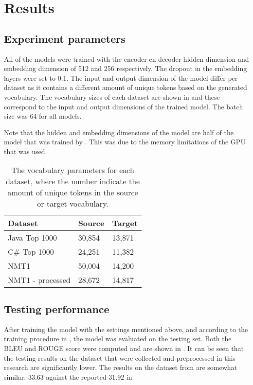 \section{Results}\label{sec:results}

\subsection{Experiment parameters}
All of the models were trained with the encoder en decoder hidden dimension and embedding dimension of 512 and 256 respectively. The dropout in the embedding layers were set to $0.1$. The input and output dimension of the model differ per dataset as it contains a different amount of unique tokens based on the generated vocabulary. The vocabulary sizes of each dataset are shown in  and these correspond to the input and output dimensions of the trained model. The batch size was 64 for all models.

Note that the hidden and embedding dimensions of the model are half of the model that was trained by \citeauthor{jiang_automatically_2017}. This was due to the memory limitations of the GPU that was used.
\begin{table}[]
\caption{The vocabulary parameters for each dataset, where the number indicate the amount of unique tokens in the source or target vocabulary.}
\label{tbl:vocabs}
\begin{tabular}{@{}lll@{}}
\toprule
\textbf{Dataset}                   & \textbf{Source} & \textbf{Target} \\ \midrule
Java Top 1000                      & 30,854                      & 13,871                      \\
C\# Top 1000                       & 24,251                      & 11,382                      \\
NMT1 \cite{jiang_automatically_2017} & 50,004                      & 14,200                      \\
NMT1 - processed                   & 28,672                      & 14,817                      \\ \bottomrule
\end{tabular}
\end{table}

\subsection{Testing performance}
After training the model with the settings mentioned above, and according to the training procedure in , the model was evaluated on the testing set. Both the BLEU and ROUGE score were computed and are shown in . It can be seen that the testing results on the dataset that were collected and preprocessed in this research are significantly lower. The results on the dataset from \citeauthor{jiang_automatically_2017} are somewhat similar: 33.63 against the reported 31.92 in \cite{jiang_automatically_2017} 

